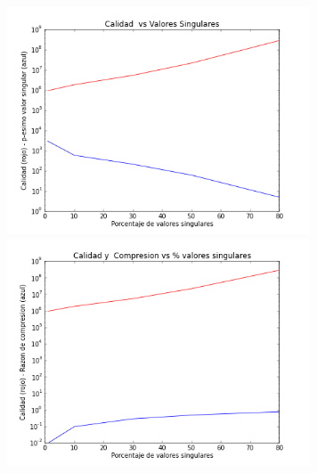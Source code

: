 \documentclass[spanish, fleqn]{article}
\begin{document}
\begin{figure}[htbp]
\begin{minipage}[b]{0.5\linewidth}
			\includegraphics[width=90mm]{./Graficos/paisaje-quality}
			\includegraphics[width=90mm]{./Graficos/paisaje-size}
			\label{fig:figura2}
		\end{minipage}
	\end{figure}
\end{document}
